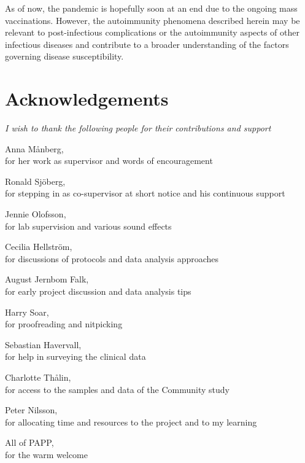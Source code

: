\documentclass{article}
\begin{document}
As of now, the pandemic is hopefully soon at an end due to the ongoing mass vaccinations. However, the autoimmunity phenomena described herein may be relevant to post-infectious complications or the autoimmunity aspects of other infectious diseases and contribute to a broader understanding of the factors governing disease susceptibility.

\newpage
{}
\section*{Acknowledgements}
\vspace{2cm}
{
\large
\itshape
I wish to thank the following people for their contributions and support
\vspace{1cm}

Anna Månberg, \\
for her work as supervisor and words of encouragement \vspace{0.5cm}

Ronald Sjöberg, \\
for stepping in as co-supervisor at short notice and his continuous support\vspace{0.5cm}

Jennie Olofsson, \\
for lab supervision and various sound effects\vspace{0.5cm}

Cecilia Hellström, \\
for discussions of protocols and data analysis approaches\vspace{0.5cm}

August Jernbom Falk, \\
for early project discussion and data analysis tips\vspace{0.5cm}

Harry Soar, \\
for proofreading and nitpicking\vspace{0.5cm}

Sebastian Havervall, \\
for help in surveying the clinical data\vspace{0.5cm}

Charlotte Thålin, \\
for access to the samples and data of the Community study\vspace{0.5cm}

Peter Nilsson, \\
for allocating time and resources to the project and to my learning\vspace{0.5cm}

All of PAPP, \\
for the warm welcome
}
\end{document}
